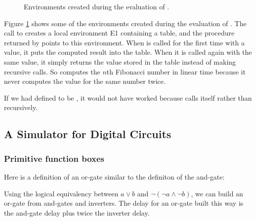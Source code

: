 \begin{exe}[3.27]
\begin{figure}
        \caption{Environments created during the evaluation of
        .}
        \label{3.27fig}
    \end{figure}
    Figure \ref{3.27fig} shows some of the environments created during the 
    evaluation of .
    The call to  creates a local environment E1 containing 
    a table, and the procedure returned by  points to this 
    environment. When  is called for the first time with a value, 
    it puts the computed result into the table. When it is called again with the 
    same value, it simply returns the value stored in the table instead of 
    making recursive calls. So  computes the $n$th Fibonacci 
    number in linear time because it never computes the value for the same 
    number twice.

    If we had defined  to be , it would not 
    have worked because  calls itself rather than  
    recursively.
\end{exe}

\subsection{A Simulator for Digital Circuits}

\subsubsection{Primitive function boxes}

\begin{exe}[3.28]
    Here is a definition of an or-gate similar to the definiton of the and-gate:
\end{exe}

\begin{exe}[3.29]
    Using the logical equivalency between $a \lor b$ and $\lnot (\lnot a \land 
    \lnot b)$, we can build an or-gate from and-gates and inverters. The delay 
    for an or-gate built this way is the and-gate delay plus twice the inverter 
    delay.
\end{exe}

